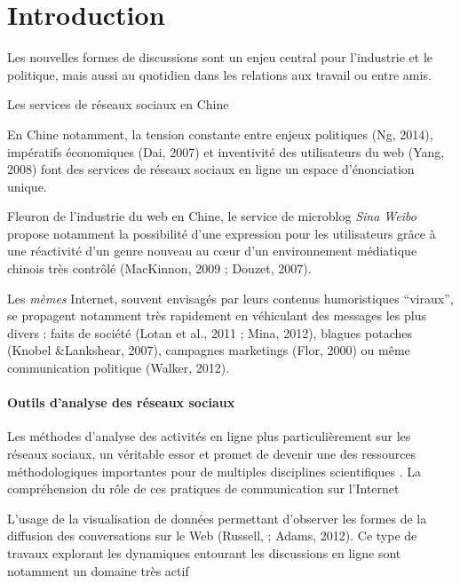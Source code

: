 \chapter*{Introduction}


\newthought{}
Les nouvelles formes de discussions sont un enjeu central pour l{\textquoteright}industrie et le politique, mais aussi au quotidien dans les relations aux travail ou entre amis.  


Les services de réseaux sociaux en Chine

En Chine notamment, la tension constante entre enjeux politiques (Ng, 2014), impératifs économiques (Dai, 2007) et inventivité des utilisateurs du web (Yang, 2008) font des services de réseaux sociaux en ligne un espace d{\textquoteright}énonciation unique. %

Fleuron de l{\textquoteright}industrie du web en Chine, le service de microblog \textit{Sina Weibo }propose notamment la possibilité d{\textquoteright}une expression pour les utilisateurs gr\^ace à une réactivité d{\textquoteright}un genre nouveau au c{\oe}ur d{\textquoteright}un environnement médiatique chinois très contrôlé (MacKinnon, 2009 ; Douzet, 2007). 

Les \textit{mèmes }Internet, souvent envisagés par leurs contenus humoristiques {\textquotedblleft}viraux{\textquotedblright}, se propagent notamment très rapidement en véhiculant des messages les plus divers : faits de société (Lotan et al., 2011 ; Mina, 2012), blagues potaches (Knobel \&Lankshear, 2007), campagnes marketings (Flor, 2000) ou m\^eme communication politique (Walker, 2012).


\subsubsection{Outils d'analyse des réseaux sociaux}

Les méthodes d{\textquoteright}analyse des activités en ligne plus particulièrement sur les réseaux sociaux,  un véritable essor et promet de devenir une des ressources méthodologiques importantes pour de multiples disciplines scientifiques \cite{Nettleton2013}. La compréhension du rôle de ces pratiques de communication sur l{\textquoteright}Internet 

L{\textquoteright}usage de la visualisation de données permettant d{\textquoteright}observer les formes de la diffusion des conversations sur le Web (Russell, ; Adams, 2012). Ce type de travaux explorant les dynamiques entourant les discussions en ligne sont notamment un domaine très actif \cite{Nettleton2013} 
 
